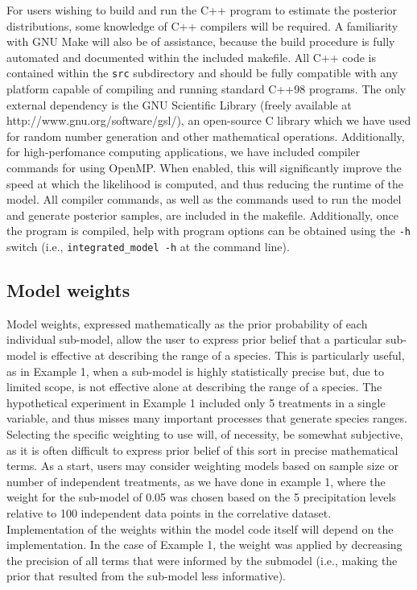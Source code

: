 \documentclass[11pt]{article}
\begin{document}
For users wishing to build and run the C++ program to estimate the posterior distributions, some knowledge of C++ compilers will be required.
A familiarity with GNU Make will also be of assistance, because the build procedure is fully automated and documented within the included makefile.
All C++ code is contained within the {\tt src} subdirectory and should be fully compatible with any platform capable of compiling and running standard C++98 programs.
The only external dependency is the GNU Scientific Library (freely available at http://www.gnu.org/software/gsl/), an open-source C library which we have used for random number generation and other mathematical operations.
Additionally, for high-perfomance computing applications, we have included compiler commands for using OpenMP.
When enabled, this will significantly improve the speed at which the likelihood is computed, and thus reducing the runtime of the model.
All compiler commands, as well as the commands used to run the model and generate posterior samples, are included in the makefile.
Additionally, once the program is compiled, help with program options can be obtained using the {\tt -h} switch (i.e., {\tt integrated\_model -h} at the command line).


\subsection*{Model weights}
Model weights, expressed mathematically as the prior probability of each individual sub-model, allow the user to express prior belief that a particular sub-model is effective at describing the range of a species.
This is particularly useful, as in Example 1, when a sub-model is highly statistically precise but, due to limited scope, is not effective alone at describing the range of a species.
The hypothetical experiment in Example 1 included only 5 treatments in a single variable, and thus misses many important processes that generate species ranges.
Selecting the specific weighting to use will, of necessity, be somewhat subjective, as it is often difficult to express prior belief of this sort in precise mathematical terms.
As a start, users may consider weighting models based on sample size or number of independent treatments, as we have done in example 1, where the weight for the sub-model of 0.05 was chosen based on the 5 precipitation levels relative to 100 independent data points in the correlative dataset.
Implementation of the weights within the model code itself will depend on the implementation.
In the case of Example 1, the weight was applied by decreasing the precision of all terms that were informed by the submodel (i.e., making the prior that resulted from the sub-model less informative).


\renewcommand\refname{Literature Cited}
{}

\end{document}
